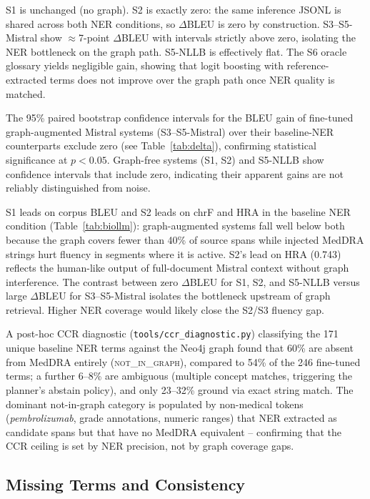 \documentclass[11pt,a4paper,twocolumn]{article}
\begin{document}
\begin{finding}
S1 is unchanged (no graph). S2 is exactly zero: the same inference JSONL is
shared across both NER conditions, so $\Delta$BLEU is zero by construction.
S3--S5-Mistral show $\approx$7-point $\Delta$BLEU with intervals strictly
above zero, isolating the NER bottleneck on the graph path. S5-NLLB is
effectively flat. The S6 oracle glossary yields negligible gain, showing
that logit boosting with reference-extracted terms does not improve over
the graph path once NER quality is matched.
\end{finding}

The 95\% paired bootstrap confidence intervals for the BLEU gain of fine-tuned
graph-augmented Mistral systems (S3--S5-Mistral) over their baseline-NER
counterparts exclude zero (see Table~\ref{tab:delta}), confirming statistical
significance at $p < 0.05$. Graph-free systems (S1, S2) and S5-NLLB show
confidence intervals that include zero, indicating their apparent gains are not
reliably distinguished from noise.

S1 leads on corpus BLEU and S2 leads on chrF and HRA in the baseline NER
condition (Table~\ref{tab:biollm}): graph-augmented systems fall well below
both because the graph covers fewer than 40\% of source spans while injected
MedDRA strings hurt fluency in segments where it is active. S2's lead on HRA
(0.743) reflects the human-like output of full-document Mistral context without
graph interference. The contrast between zero $\Delta$BLEU for S1, S2, and
S5-NLLB versus large $\Delta$BLEU for S3--S5-Mistral isolates the bottleneck
upstream of graph retrieval. Higher NER coverage would likely close the S2/S3
fluency gap.

A post-hoc CCR diagnostic (\texttt{tools/ccr\_diagnostic.py}) classifying the
171 unique baseline NER terms against the Neo4j graph found that 60\% are absent
from MedDRA entirely (\textsc{not\_in\_graph}), compared to 54\% of the 246
fine-tuned terms; a further 6--8\% are ambiguous (multiple concept matches,
triggering the planner's abstain policy), and only 23--32\% ground via exact
string match. The dominant not-in-graph category is populated by non-medical
tokens (\textit{pembrolizumab}, grade annotations, numeric ranges) that NER
extracted as candidate spans but that have no MedDRA equivalent -- confirming
that the CCR ceiling is set by NER precision, not by graph coverage gaps.

\subsection{Missing Terms and Consistency}
\end{document}
